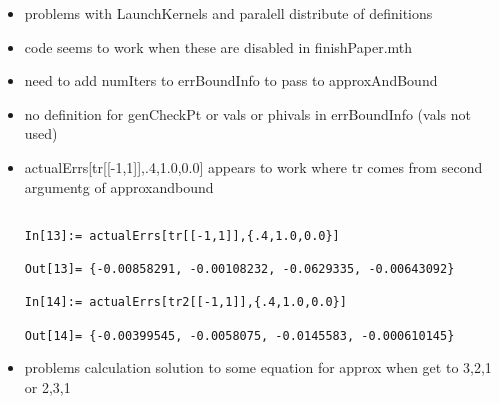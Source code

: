\documentclass[hyperref,idxtotoc]{labbook}
\begin{document}
\begin{itemize}
\item problems  with LaunchKernels and paralell distribute of definitions
\item code seems to work when these are disabled in finishPaper.mth
\item need to add numIters to errBoundInfo to pass to approxAndBound
\item no definition for genCheckPt or vals or phivals in errBoundInfo (vals not used)
\item actualErrs[tr[[-1,1]],{.4,1.0,0.0}] appears to work where tr comes from second argumentg of approxandbound
\begin{verbatim}

In[13]:= actualErrs[tr[[-1,1]],{.4,1.0,0.0}]

Out[13]= {-0.00858291, -0.00108232, -0.0629335, -0.00643092}

In[14]:= actualErrs[tr2[[-1,1]],{.4,1.0,0.0}]

Out[14]= {-0.00399545, -0.0058075, -0.0145583, -0.000610145}

\end{verbatim}
\item problems calculation solution to some equation for approx when get to {3,2,1} or {2,3,1}
\end{itemize}





\printindex
\end{document}
